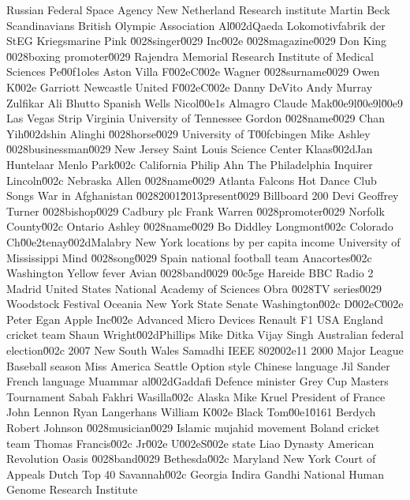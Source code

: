 Russian Federal Space Agency  New Netherland  Research institute  
Martin Beck  Scandinavians  British Olympic Association  
Al\u002dQaeda  Lokomotivfabrik der StEG  Kriegsmarine  
Pink \u0028singer\u0029  Inc\u002e \u0028magazine\u0029  Don King \u0028boxing promoter\u0029  
Rajendra Memorial Research Institute of Medical Sciences  Pe\u00f1oles  Aston Villa F\u002eC\u002e  
Wagner \u0028surname\u0029  Owen K\u002e Garriott  Newcastle United F\u002eC\u002e  
Danny DeVito  Andy Murray  Zulfikar Ali Bhutto  
Spanish Wells  Nicol\u00e1s Almagro  Claude Mak\u00e9l\u00e9l\u00e9  
Las Vegas Strip  Virginia  University of Tennessee  
Gordon \u0028name\u0029  Chan Yih\u002dshin  Alinghi \u0028horse\u0029  
University of T\u00fcbingen  Mike Ashley \u0028businessman\u0029  New Jersey  
Saint Louis Science Center  Klaas\u002dJan Huntelaar  Menlo Park\u002c California  
Philip Ahn  The Philadelphia Inquirer  Lincoln\u002c Nebraska  
Allen \u0028name\u0029  Atlanta Falcons  Hot Dance Club Songs  
War in Afghanistan \u00282001\u2013present\u0029  Billboard 200  Devi  
Geoffrey Turner \u0028bishop\u0029  Cadbury plc  Frank Warren \u0028promoter\u0029  
Norfolk County\u002c Ontario  Ashley \u0028name\u0029  Bo Diddley  
Longmont\u002c Colorado  Ch\u00e2tenay\u002dMalabry  New York locations by per capita income  
University of Mississippi  Mind \u0028song\u0029  Spain national football team  
Anacortes\u002c Washington  Yellow fever  Avian \u0028band\u0029  
\u00c5ge Hareide  BBC Radio 2  Madrid  
United States National Academy of Sciences  Obra \u0028TV series\u0029  Woodstock Festival  
Oceania  New York State Senate  Washington\u002c D\u002eC\u002e  
Peter Egan  Apple Inc\u002e  Advanced Micro Devices  
Renault F1  USA  England cricket team  
Shaun Wright\u002dPhillips  Mike Ditka  Vijay Singh  
Australian federal election\u002c 2007  New South Wales  Samadhi  
IEEE 802\u002e11  2000 Major League Baseball season  Miss America  
Seattle  Option style  Chinese language  
Jil Sander  French language  Muammar al\u002dGaddafi  
Defence minister  Grey Cup  Masters Tournament  
Sabah Fakhri  Wasilla\u002c Alaska  Mike Kruel  
President of France  John Lennon  Ryan Langerhans  
William K\u002e Black  Tom\u00e1\u0161 Berdych  Robert Johnson \u0028musician\u0029  
Islamic mujahid movement  Boland cricket team  Thomas Francis\u002c Jr\u002e  
U\u002eS\u002e state  Liao Dynasty  American Revolution  
Oasis \u0028band\u0029  Bethesda\u002c Maryland  New York Court of Appeals  
Dutch Top 40  Savannah\u002c Georgia  Indira Gandhi  
National Human Genome Research Institute  